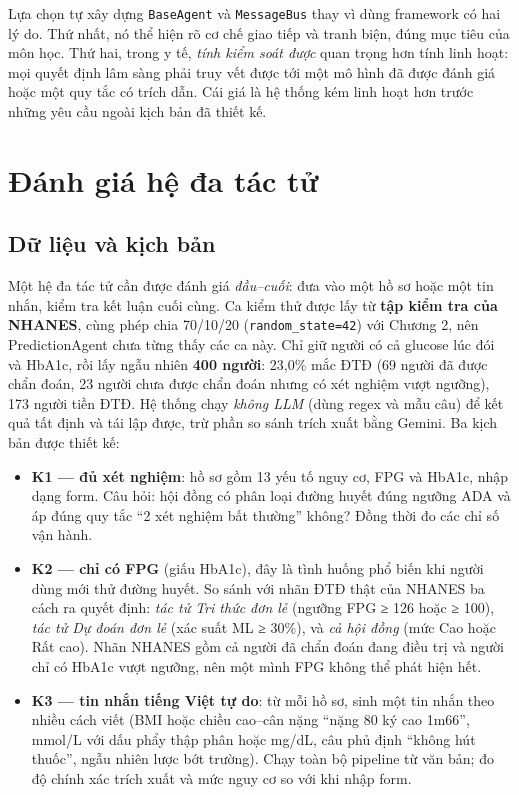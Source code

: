 Lựa chọn tự xây dựng \texttt{BaseAgent} và \texttt{MessageBus} thay vì dùng framework có hai lý do. Thứ nhất, nó thể hiện rõ cơ chế giao tiếp và tranh biện, đúng mục tiêu của môn học. Thứ hai, trong y tế, \emph{tính kiểm soát được} quan trọng hơn tính linh hoạt: mọi quyết định lâm sàng phải truy vết được tới một mô hình đã được đánh giá hoặc một quy tắc có trích dẫn. Cái giá là hệ thống kém linh hoạt hơn trước những yêu cầu ngoài kịch bản đã thiết kế.

\section{Đánh giá hệ đa tác tử}

\subsection{Dữ liệu và kịch bản}

Một hệ đa tác tử cần được đánh giá \emph{đầu–cuối}: đưa vào một hồ sơ hoặc một tin nhắn, kiểm tra kết luận cuối cùng. Ca kiểm thử được lấy từ \textbf{tập kiểm tra của NHANES}, cùng phép chia 70/10/20 (\texttt{random\_state=42}) với Chương 2, nên PredictionAgent chưa từng thấy các ca này. Chỉ giữ người có cả glucose lúc đói và HbA1c, rồi lấy ngẫu nhiên \textbf{400 người}: 23,0\% mắc ĐTĐ (69 người đã được chẩn đoán, 23 người chưa được chẩn đoán nhưng có xét nghiệm vượt ngưỡng), 173 người tiền ĐTĐ. Hệ thống chạy \emph{không LLM} (dùng regex và mẫu câu) để kết quả tất định và tái lập được, trừ phần so sánh trích xuất bằng Gemini. Ba kịch bản được thiết kế:

\begin{itemize}
  \item \textbf{K1 — đủ xét nghiệm}: hồ sơ gồm 13 yếu tố nguy cơ, FPG và HbA1c, nhập dạng form. Câu hỏi: hội đồng có phân loại đường huyết đúng ngưỡng ADA và áp đúng quy tắc ``2 xét nghiệm bất thường'' không? Đồng thời đo các chỉ số vận hành.
  \item \textbf{K2 — chỉ có FPG} (giấu HbA1c), đây là tình huống phổ biến khi người dùng mới thử đường huyết. So sánh với nhãn ĐTĐ thật của NHANES ba cách ra quyết định: \emph{tác tử Tri thức đơn lẻ} (ngưỡng FPG ≥ 126 hoặc ≥ 100), \emph{tác tử Dự đoán đơn lẻ} (xác suất ML ≥ 30\%), và \emph{cả hội đồng} (mức Cao hoặc Rất cao). Nhãn NHANES gồm cả người đã chẩn đoán đang điều trị và người chỉ có HbA1c vượt ngưỡng, nên một mình FPG không thể phát hiện hết.
  \item \textbf{K3 — tin nhắn tiếng Việt tự do}: từ mỗi hồ sơ, sinh một tin nhắn theo nhiều cách viết (BMI hoặc chiều cao–cân nặng ``nặng 80 ký cao 1m66'', mmol/L với dấu phẩy thập phân hoặc mg/dL, câu phủ định ``không hút thuốc'', ngẫu nhiên lược bớt trường). Chạy toàn bộ pipeline từ văn bản; đo độ chính xác trích xuất và mức nguy cơ so với khi nhập form.
\end{itemize}

